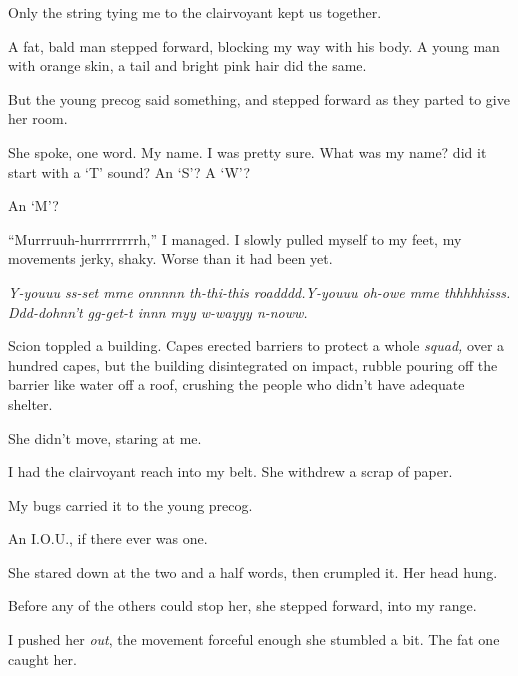 Only the string tying me to the clairvoyant kept us together.



A fat, bald man stepped forward, blocking my way with his body.  A young man with orange skin, a tail and bright pink hair did the same.



But the young precog said something, and stepped forward as they parted to give her room.



She spoke, one word.  My name.  I was pretty sure.  What was my name?  did it start with a `T' sound?  An `S'?  A `W'?



An `M'?



``Murrruuh-hurrrrrrrrh,'' I managed.  I slowly pulled myself to my feet, my movements jerky, shaky.  Worse than it had been yet.



\emph{Y-youuu ss-set mme onnnnn th-thi-this roadddd.}\emph{Y-youuu oh-owe mme thhhhhisss.   Ddd-dohnn't gg-get-t innn myy w-wayyy n-noww.}



Scion toppled a building.  Capes erected barriers to protect a whole \emph{squad, }over a hundred capes, but the building disintegrated on impact, rubble pouring off the barrier like water off a roof, crushing the people who didn't have adequate shelter.



She didn't move, staring at me.



I had the clairvoyant reach into my belt.  She withdrew a scrap of paper.



My bugs carried it to the young precog.



An I.O.U., if there ever was one.



She stared down at the two and a half words, then crumpled it.  Her head hung.



Before any of the others could stop her, she stepped forward, into my range.



I pushed her \emph{out}, the movement forceful enough she stumbled a bit.  The fat one caught her.



